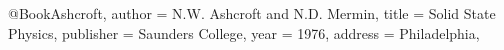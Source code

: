 \begin{thebibliography}{99}
\setlength{\parskip}{1em}


@Book{Ashcroft,
  author = 	 {N.W. Ashcroft and N.D. Mermin},
  title = 	 {{Solid State Physics}},
  publisher = 	 {Saunders College},
  year = 	 1976,
  address = 	 {Philadelphia},
}

\end{thebibliography}